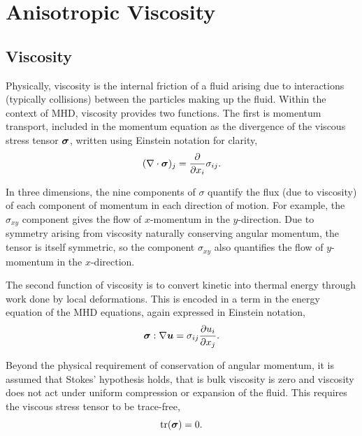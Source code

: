 \section{Anisotropic Viscosity}

\subsection{Viscosity}

Physically, viscosity is the internal friction of a fluid arising due to interactions (typically collisions) between the particles making up the fluid. Within the context of MHD, viscosity provides two functions. The first is momentum transport, included in the momentum equation as the divergence of the viscous stress tensor ${\bm \sigma}$, written using Einstein notation for clarity,
\begin{equation}
  \label{eq:viscous_momenum_transport}
  (\nabla \cdot {\bm \sigma})_j = \frac{\partial}{\partial x_i} \sigma_{ij}.
\end{equation}

In three dimensions, the nine components of $\sigma$ quantify the flux (due to viscosity) of each component of momentum in each direction of motion. For example, the $\sigma_{xy}$ component gives the flow of $x$-momentum in the $y$-direction. Due to symmetry arising from viscosity naturally conserving angular momentum, the tensor is itself symmetric, so the component $\sigma_{xy}$ also quantifies the flow of $y$-momentum in the $x$-direction.

The second function of viscosity is to convert kinetic into thermal energy through work done by local deformations. This is encoded in a term in the energy equation of the MHD equations, again expressed in Einstein notation,
\begin{equation}
  \label{eq:viscous_heat_generation}
  {\bm \sigma} : \nabla {\bm u} = \sigma_{ij} \frac{\partial u_i}{\partial x_j}.
\end{equation}

Beyond the physical requirement of conservation of angular momentum, it is assumed that Stokes' hypothesis holds, that is bulk viscosity is zero and viscosity does not act under uniform compression or expansion of the fluid. This requires the viscous stress tensor to be trace-free,
\begin{equation}
  \label{eq:trace_free_tensor}
  \text{tr}({\bm \sigma}) = 0.
\end{equation}


